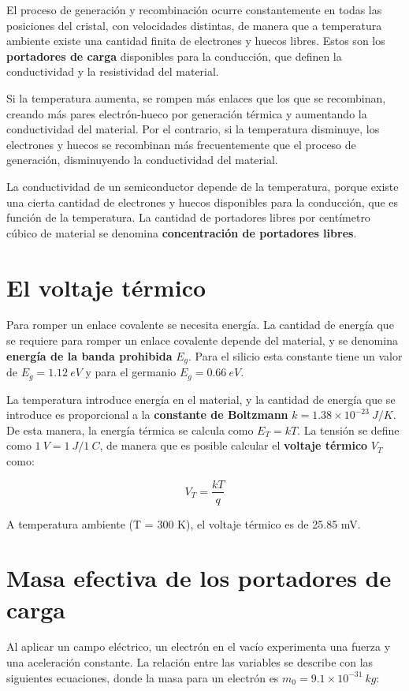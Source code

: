 El proceso de generación y recombinación ocurre constantemente en todas las posiciones del cristal, con velocidades distintas, de manera que a temperatura ambiente existe una cantidad finita de electrones y huecos libres. Estos son los \textbf{portadores de carga} disponibles para la conducción, que definen la conductividad y la resistividad del material.

Si la temperatura aumenta, se rompen más enlaces que los que se recombinan, creando más pares electrón-hueco por generación térmica y aumentando la conductividad del material. Por el contrario, si la temperatura disminuye, los electrones y huecos se recombinan más frecuentemente que el proceso de generación, disminuyendo la conductividad del material.

La conductividad de un semiconductor depende de la temperatura, porque existe una cierta cantidad de electrones y huecos disponibles para la conducción, que es función de la temperatura. La cantidad de portadores libres por centímetro cúbico de material se denomina \textbf{concentración de portadores libres}.


\newpage
\section{El voltaje térmico}

Para romper un enlace covalente se necesita energía. La cantidad de energía que se requiere para romper un enlace covalente depende del material, y se denomina \textbf{energía de la banda prohibida} $E_g$. Para el silicio esta constante tiene un valor de $E_g=1.12\ eV$ y para el germanio $E_g=0.66\ eV$.

La temperatura introduce energía en el material, y la cantidad de energía que se introduce es proporcional a la \textbf{constante de Boltzmann} $k=1.38\times{}10^{-23}\ J/K$. De esta manera, la energía térmica se calcula como $E_T=kT$. La tensión se define como $1\ V = 1\ J/1\ C$, de manera que es posible calcular el \textbf{voltaje térmico} $V_T$ como:

\[V_T=\dfrac{kT}{q}\]

A temperatura ambiente (T = 300 K), el voltaje térmico es de 25.85 mV.


\section{Masa efectiva de los portadores de carga}

Al aplicar un campo eléctrico, un electrón en el vacío experimenta una fuerza y una aceleración constante. La relación entre las variables se describe con las siguientes ecuaciones, donde la masa para un electrón es $m_0=9.1\times{}10^{-31}\ kg$:

